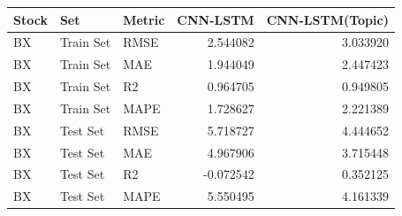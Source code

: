 \begin{tabular}{lllrr}
\toprule
Stock & Set & Metric & CNN-LSTM & CNN-LSTM(Topic) \\
\midrule
BX & Train Set & RMSE & 2.544082 & 3.033920 \\
BX & Train Set & MAE & 1.944049 & 2.447423 \\
BX & Train Set & R2 & 0.964705 & 0.949805 \\
BX & Train Set & MAPE & 1.728627 & 2.221389 \\
BX & Test Set & RMSE & 5.718727 & 4.444652 \\
BX & Test Set & MAE & 4.967906 & 3.715448 \\
BX & Test Set & R2 & -0.072542 & 0.352125 \\
BX & Test Set & MAPE & 5.550495 & 4.161339 \\
\bottomrule
\end{tabular}
